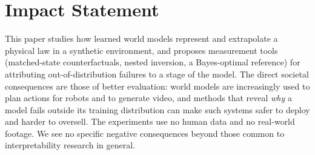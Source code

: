 \section*{Impact Statement}

This paper studies how learned world models represent and extrapolate a physical law in a
synthetic environment, and proposes measurement tools (matched-state counterfactuals, nested
inversion, a Bayes-optimal reference) for attributing out-of-distribution failures to a stage of
the model. The direct societal consequences are those of better evaluation: world models are
increasingly used to plan actions for robots and to generate video, and methods that reveal
\emph{why} a model fails outside its training distribution can make such systems safer to deploy
and harder to oversell. The experiments use no human data and no real-world footage. We see no
specific negative consequences beyond those common to interpretability research in general.
